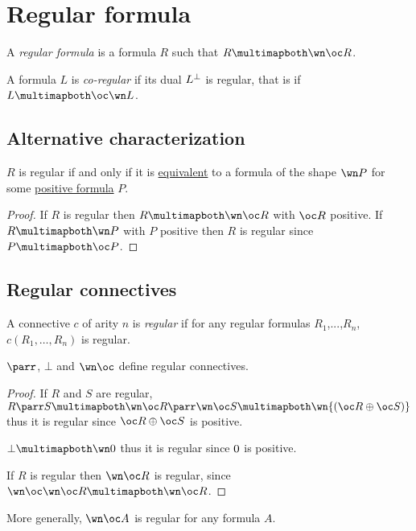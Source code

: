 \section{Regular formula}\label{regular-formula}

A \emph{regular formula} is a formula \(R\) such that
\(R\linequiv\wn\oc R\).

A formula \(L\) is \emph{co-regular} if its dual \(L^\bot\) is regular,
that is if \(L\linequiv\oc\wn L\).

\subsection{Alternative characterization}\label{alternative-characterization}

\(R\) is regular if and only if it is
\hyperref[equivalences]{equivalent} to a formula of the
shape \(\wn P\) for some \hyperref[positive-formula]{positive formula}
\(P\).

\begin{proof}
If $R$ is regular then $R\linequiv\wn\oc R$ with $\oc R$ positive. If $R\linequiv\wn P$ with $P$ positive then $R$ is regular since $P\linequiv\oc P$.
\end{proof}

\subsection{Regular connectives}\label{regular-connectives}

A connective \(c\) of arity \(n\) is \emph{regular} if for any regular
formulas \(R_1\),...,\(R_n\), \(c(R_1,\dots,R_n)\) is regular.

\begin{proposition}
$\parr$, $\bot$ and $\wn\oc$ define regular connectives.
\end{proposition}

\begin{proof}
If $R$ and $S$ are regular, $R\parr S \linequiv \wn\oc R \parr \wn\oc S \linequiv \wn{(\oc R\plus\oc S)}$ thus it is regular since $\oc R\plus\oc S$ is positive.

$\bot\linequiv\wn\zero$ thus it is regular since $0$ is positive.

If $R$ is regular then $\wn\oc R$ is regular, since $\wn\oc\wn\oc R\linequiv \wn\oc R$.
\end{proof}

More generally, \(\wn\oc A\) is regular for any formula \(A\).


